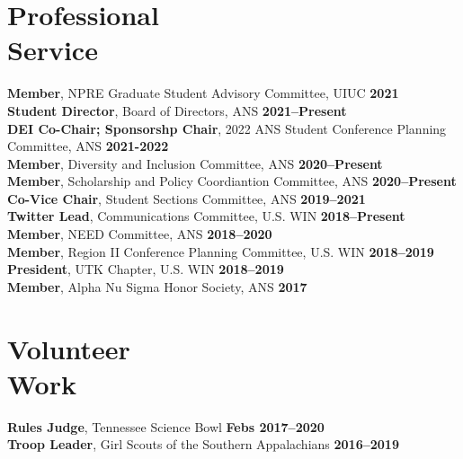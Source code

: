 \documentclass[margin,line]{resume}
\begin{document}
\begin{resume}
    \section{\mysidestyle Professional\\Service}
                \textbf{Member}, NPRE Graduate Student Advisory Committee, UIUC \hfill \textbf{2021}\vspace{0.5mm}\\
                \textbf{Student Director}, Board of Directors, ANS \hfill \textbf{2021--Present}\vspace{.5mm}\\
                \textbf{DEI Co-Chair; Sponsorshp Chair}, 2022 ANS Student Conference Planning Committee, ANS \hfill 
                \textbf{2021-2022} \\
                \textbf{Member}, Diversity and Inclusion Committee, ANS  \hfill \textbf{2020--Present}\vspace{.5mm}\\%
                \textbf{Member}, Scholarship and Policy Coordiantion Committee, ANS  \hfill \textbf{2020--Present}\vspace{.5mm}\\%
                \textbf{Co-Vice Chair}, Student Sections Committee, ANS  \hfill \textbf{2019--2021}\vspace{.5mm}\\%
                \textbf{Twitter Lead}, Communications Committee, U.S. WIN  \hfill \textbf{2018--Present}\vspace{.5mm}\\%
                \textbf{Member}, NEED Committee, ANS  \hfill \textbf{2018--2020}\vspace{.5mm}\\%
                \textbf{Member}, Region II Conference Planning Committee, U.S. WIN  \hfill \textbf{2018--2019}\vspace{.5mm}\\%
                \textbf{President}, UTK Chapter, U.S. WIN  \hfill \textbf{2018--2019}\vspace{.5mm}\\%
                \textbf{Member}, Alpha Nu Sigma Honor Society, ANS \hfill \textbf{2017}\vspace{.5mm}%
    
    \section{\mysidestyle Volunteer\\Work}
                \textbf{Rules Judge}, Tennessee Science Bowl \hfill \textbf{Febs 2017--2020}\\
                \textbf{Troop Leader}, Girl Scouts of the Southern Appalachians \hfill \textbf{2016--2019}\vspace{.5mm}\\%
                

\end{resume}
\end{document}

